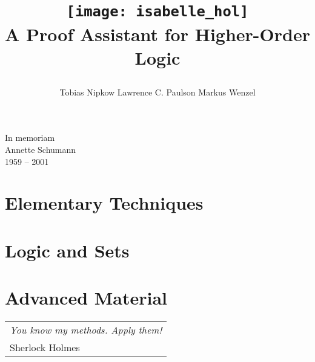 \documentclass{article}
\begin{document}
\title{
\begin{center}
\texttt{[image: isabelle\_hol]}
       \\ \vspace{0.5cm} A Proof Assistant for Higher-Order Logic
\end{center}}
\author{Tobias Nipkow \quad Lawrence C. Paulson \quad Markus Wenzel%
}
\maketitle

\setcounter{page}{5}
\vspace*{\fill}
\begin{center}
\LARGE In memoriam \\[1ex]
{\sc Annette Schumann}\\[1ex]
1959 -- 2001
\end{center}
\vspace*{\fill}
\vspace*{\fill}
\newpage


\tableofcontents

\cleardoublepage{}

\part{Elementary Techniques}




\part{Logic and Sets}




\part{Advanced Material}




\markboth{}{}
\cleardoublepage
\vspace*{\fill}
\begin{flushright}
\begin{tabular}{l}
{\large\sf\slshape You know my methods. Apply them!}\\[1ex]
Sherlock Holmes
\end{tabular}
\end{flushright}
\vspace*{\fill}
\vspace*{\fill}

\underscoreoff





\underscoreoff
\printindex
\end{document}
